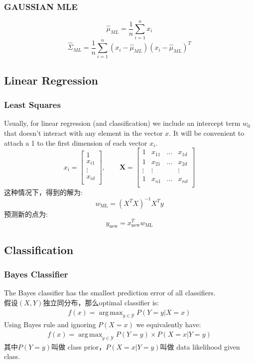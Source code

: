 \documentclass{article} 	%
\DeclareMathOperator*{\argmax}{arg\,max}
\begin{document}
		\subsubsection{GAUSSIAN MLE}
			$$\hat{\mu}_{\scriptscriptstyle ML} = \frac{1}{n}\sum_{i=1}^nx_i$$
			$$\hat{\Sigma}_{\scriptscriptstyle ML} = \frac{1}{n}\sum_{i=1}^n(x_i - \hat{\mu}_{\scriptscriptstyle ML})(x_i - \hat{\mu}_{\scriptscriptstyle ML})^T$$
	
	\subsection{Linear Regression}
		\subsubsection{Least Squares}
			Usually, for linear regression (and classification) we include an intercept term $w_0$ that doesn’t interact with any element in the vector $x$. It will be 
			convenient to attach a 1 to the first dimension of each vector $x_i$.
			\[
			x_i = \left [
				\begin{array}{c}
				1\\
				x_{i1}\\
				\vdots\\
				x_{id}\\
				\end{array}
				\right ]
			, \qquad
			\mathbf{X} = \left [
					    \begin{array}{cccc}
					    1 &x_{11}& \ldots & x_{1d}\\
					    1 &x_{21}& \ldots & x_{2d}\\
					    \vdots &\vdots&  & \vdots\\
					    1 &x_{n1}& \ldots & x_{nd}\\
					    \end{array}
					    \right]
			\]
			这种情况下，得到的解为:
			\[
			w_{\scriptscriptstyle \mathrm{ML}} = (X^TX)^{-1}X^Ty
			\]
			预测新的点为:
			$$y_{\scriptscriptstyle\mathrm{new}} = x_{\scriptscriptstyle\mathrm{new}}^Tw_{\scriptscriptstyle \mathrm{ML}} $$
			
	\subsection{Classification}
		\subsubsection{Bayes Classifier}
			The Bayes classifier has the smallest prediction error of all classifiers.\\
			假设$(X,Y)$独立同分布，那么optimal classifier is:
			\begin{eqnarray}
			f(x) = \argmax_{y\in \mathcal{Y}} P(Y=y|X=x)
			\end{eqnarray}
 			Using Bayes rule and ignoring $P(X = x)$ we equivalently have: 
			\begin{eqnarray}
			f(x) = \argmax_{y\in \mathcal{Y}} P(Y=y)\times P(X=x|Y=y)
			\end{eqnarray}
			其中$P(Y=y)$叫做 class prior，$P(X=x|Y=y)$叫做 data likelihood given class.
\end{document}
